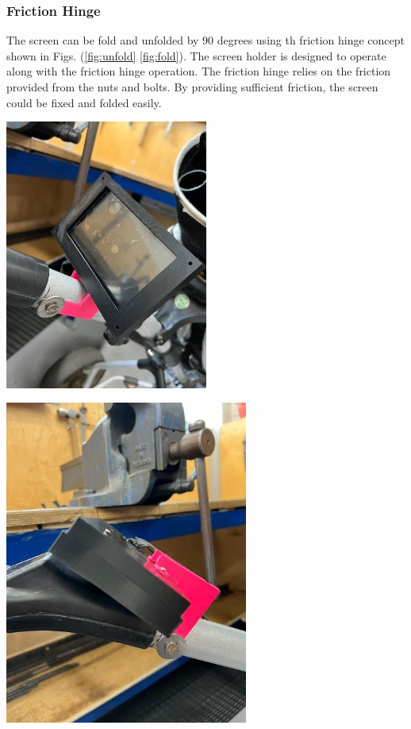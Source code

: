 \documentclass[11pt,landscape]{article}
\newenvironment{Figure}
  {\par\medskip\noindent\minipage{\linewidth}}
  {\endminipage\par\medskip}
\begin{document}
\begin{multicols}{3}
    \subsubsection{Friction Hinge}
    The screen can be fold and unfolded by 90 degrees using th friction hinge
    concept shown in Figs. (\ref{fig:unfold} \ref{fig:fold}). The screen
    holder is designed to operate along with the friction hinge operation. The
    friction hinge relies on the friction provided from the nuts and bolts. By
    providing sufficient friction, the screen could be fixed and folded easily.
    
    \begin{Figure}
        \begin{center}
            \includegraphics[width=0.5\textwidth]{Figure17.jpg}
            \label{fig:unfold}
        \end{center}
    \end{Figure}
    
    \begin{Figure}
        \begin{center}
            \includegraphics[width=0.6\textwidth]{Figure18.jpg}
            \label{fig:fold}
        \end{center}
    \end{Figure}
    

\end{multicols}
\end{document}
